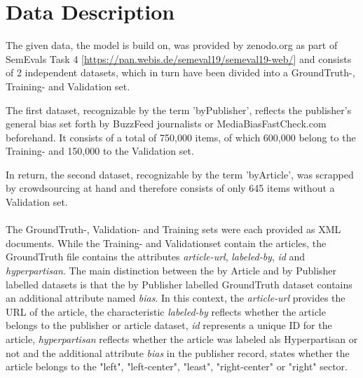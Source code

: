 \documentclass[a4paper, 11pt,titlepage,oneside,openany]{book}
\begin{document}
\chapter{Data Description}
 The given data, the model is build on, was provided by zenodo.org as part of SemEvals Task 4 [\url{https://pan.webis.de/semeval19/semeval19-web/}] and consists of 2 independent datasets, which in turn have been divided into a GroundTruth-, Training- and Validation set.
 
 \noindent The first dataset, recognizable by the term 'byPublisher', reflects the publisher's general bias set forth by BuzzFeed journalists or MediaBiasFastCheck.com beforehand. It consists of a total of 750,000 items, of which 600,000 belong to the Training- and 150,000 to the Validation set.
 
 \noindent In return, the second dataset, recognizable by the term 'byArticle', was scrapped by crowdsourcing at hand and therefore consists of only 645 items without a Validation set.\\
 \\
The GroundTruth-, Validation- and Training sets were each provided as XML documents. While the Training- and Validationset contain the articles, the GroundTruth file contains the attributes \textit{article-url}, \textit{labeled-by}, \textit{id} and \textit{hyperpartisan}. The main distinction between the by Article and by Publisher labelled datasets is that the by Publisher labelled GroundTruth dataset contains an additional attribute named \textit{bias}. In this context, the \textit{article-url} provides the URL of the article, the characteristic \textit{labeled-by} reflects whether the article belongs to the publisher or article dataset, \textit{id} represents a unique ID for the article, \textit{hyperpartisan} reflects whether the article was labeled als Hyperpartisan or not and the additional attribute \textit{bias} in the publisher record, states whether the article belongs to the "left", "left-center", "least", "right-center" or "right" sector.
 
\end{document}
